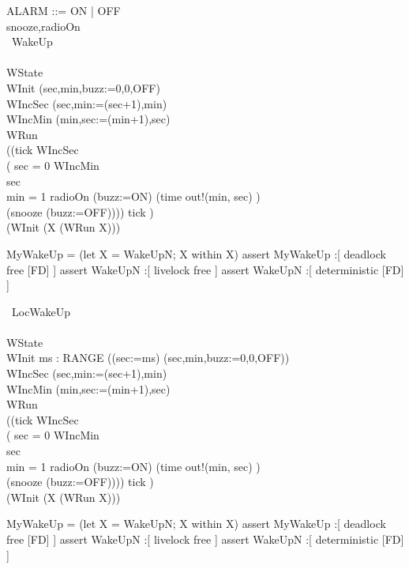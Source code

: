 \begin{circus}
ALARM ::= ON | OFF\\
\circchannel snooze,radioOn\\

\circprocess\ WakeUp \circdef\\
\circbegin\\
\circstate WState \\
WInit \circdef (sec,min,buzz:=0,0,OFF)\\
WIncSec \circdef (sec,min:=(sec+1),min)\\
WIncMin \circdef (min,sec:=(min+1),sec)\\
WRun \circdef \\
((tick \then WIncSec \circseq \\
		( \lcircguard sec = 0 \rcircguard \circguard WIncMin\\
		\extchoice \lcircguard sec  \rcircguard \circguard \Skip\\
		\extchoice \lcircguard min = 1 \rcircguard \circguard radioOn \then (buzz:=ON)
		\extchoice (time \then out!(min, sec) \then \Skip)\\
		\extchoice (snooze \then (buzz:=OFF)))) \circhide \lchanset tick \rchanset)
\\
\circspot (WInit \circseq (\circmu X \circspot (WRun \circseq X)))\\
\circend
\end{circus}


MyWakeUp = (let X = WakeUpN; X within X)
assert MyWakeUp :[ deadlock free [FD] ]
assert WakeUpN :[ livelock free ]
assert WakeUpN :[ deterministic [FD] ]

\begin{circus}

\circprocess\ LocWakeUp \circdef\\
\circbegin\\
\circstate WState \\
WInit \circdef \circvar ms : RANGE \circspot ((sec:=ms) \circseq (sec,min,buzz:=0,0,OFF))\\
WIncSec \circdef (sec,min:=(sec+1),min)\\
WIncMin \circdef (min,sec:=(min+1),sec)\\
WRun \circdef \\
((tick \then WIncSec \circseq \\
		( \lcircguard sec = 0 \rcircguard \circguard WIncMin\\
		\extchoice \lcircguard sec  \rcircguard \circguard \Skip\\
		\extchoice \lcircguard min = 1 \rcircguard \circguard radioOn \then (buzz:=ON)
		\extchoice (time \then out!(min, sec) \then \Skip)\\
		\extchoice (snooze \then (buzz:=OFF)))) \circhide \lchanset tick \rchanset)
\\
\circspot (WInit \circseq (\circmu X \circspot (WRun \circseq X)))\\
\circend
\end{circus}

MyWakeUp = (let X = WakeUpN; X within X)
assert MyWakeUp :[ deadlock free [FD] ]
assert WakeUpN :[ livelock free ]
assert WakeUpN :[ deterministic [FD] ]
